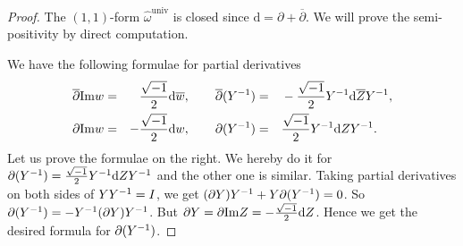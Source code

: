 \begin{proof}
The $(1,1)$-form $\hat{\omega}^{\mathrm{univ}}$ is  closed since $\mathrm{d} = \partial + \overline{\partial}$. We will prove the semi-positivity by direct computation.


We have the following formulae for partial derivatives
  \begin{equation*}
    \begin{aligned}
      \overline\partial \mathrm{Im} w &=& \frac{\sqrt{-1}}{2} \mathrm{d}\overline w, \qquad
      \overline\partial (Y^{-1}) &=&& -\frac{\sqrt{-1}}{2} Y^{-1} \mathrm{d} \overline Z
      Y^{-1},\\
      \partial \mathrm{Im} w &=& -\frac{\sqrt{-1}}{2} \mathrm{d} w,\qquad
      \partial (Y^{-1}) &=&& \frac{\sqrt{-1}}{2} Y^{-1} \mathrm{d}  Z Y^{-1}.
    \end{aligned}
  \end{equation*}
Let us prove the formulae on the right. We hereby do it for $\partial (Y^{-1}) = \frac{\sqrt{-1}}{2} Y^{-1} \mathrm{d}  Z Y^{-1}$ and the other one is similar. Taking partial derivatives on both sides of $Y Y^{-1} = I$, we get $(\partial Y)Y^{-1} + Y \partial (Y^{-1}) = 0$. So $\partial (Y^{-1}) = - Y^{-1}(\partial Y)Y^{-1}$. But $\partial Y = \partial \mathrm{Im}Z = - \frac{\sqrt{-1}}{2}\mathrm{d} Z$. Hence we get the desired formula for $\partial (Y^{-1})$.


\end{proof}
